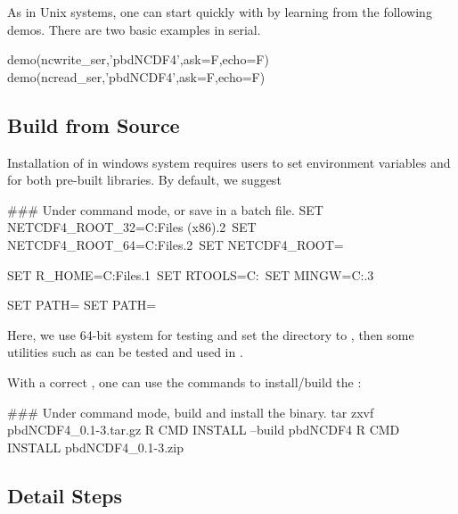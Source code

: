 As in Unix systems,
one can start quickly with  by learning from the
following demos. There are two basic examples in serial.
\begin{Command}
demo(ncwrite_ser,'pbdNCDF4',ask=F,echo=F)
demo(ncread_ser,'pbdNCDF4',ask=F,echo=F)
\end{Command}


\subsection[Build from Source]{Build from Source}
\label{sec:building_from_source}

Installation of  in windows system requires users to set
environment variables  and
 for both pre-built libraries.
By default, we suggest
\begin{Command}
### Under command mode, or save in a batch file.
SET NETCDF4_ROOT_32=C:\Program Files (x86).2\
SET NETCDF4_ROOT_64=C:\Program Files.2\
SET NETCDF4_ROOT=%

SET R_HOME=C:\Program Files\R{}.1\
SET RTOOLS=C:\Rtools\bin\
SET MINGW=C:\Rtools{}.3\bin\

SET PATH=%
SET PATH=%
\end{Command}
Here, we use 64-bit system for testing and set the  directory
to \code{PATH}, then
some utilities such as  can be tested and used in
.

With a correct , one can use the  commands
to install/build the \pkg{pbdNCDF4}:
\begin{Command}
### Under command mode, build and install the binary.
tar zxvf pbdNCDF4_0.1-3.tar.gz
R CMD INSTALL --build pbdNCDF4
R CMD INSTALL pbdNCDF4_0.1-3.zip
\end{Command}


\subsection[Detail Steps]{Detail Steps}
\label{sec:detail_steps}

